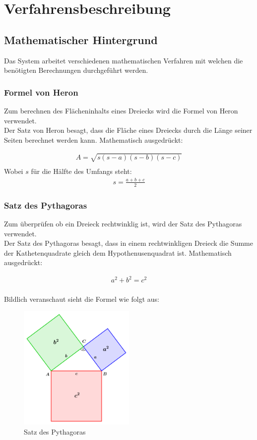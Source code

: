 \chapter{Verfahrensbeschreibung}\label{ch:verfahrensbeschreibung}


\section{Mathematischer Hintergrund}\label{sec:mathematischer_hintergrund}
Das System arbeitet verschiedenen mathematischen Verfahren mit welchen die benötigten Berechnungen durchgeführt werden.

\subsection{Formel von Heron}\label{subsec:formel_von_heron}
Zum berechnen des Flächeninhalts eines Dreiecks wird die Formel von Heron verwendet.
\\
Der Satz von Heron besagt, dass die Fläche eines Dreiecks durch die Länge seiner Seiten berechnet werden kann. Mathematisch ausgedrückt:

\begin{align}
    A=\sqrt{s(s-a)(s-b)(s-c)}\\
\end{align}
Wobei $s$ für die Hälfte des Umfangs steht:
\begin{align}
    s=\frac{a+b+c}{2}
\end{align}

\subsection{Satz des Pythagoras}\label{subsec:satz_des_pythagoras}
Zum überprüfen ob ein Dreieck rechtwinklig ist, wird der Satz des Pythagoras verwendet.
\\
Der Satz des Pythagoras besagt, dass in einem rechtwinkligen Dreieck die Summe der Kathetenquadrate gleich dem Hypothenusenquadrat ist. Mathematisch ausgedrückt:

\begin{align}
    a^2+b^2=c^2\\
\end{align}

Bildlich veranschaut sieht die Formel wie folgt aus:

\begin{figure}
    \centering
    \includegraphics[width=0.5\textwidth]{images/pythagoras.png}
    \caption{Satz des Pythagoras}
    \label{fig:pythagoras}
\end{figure}
